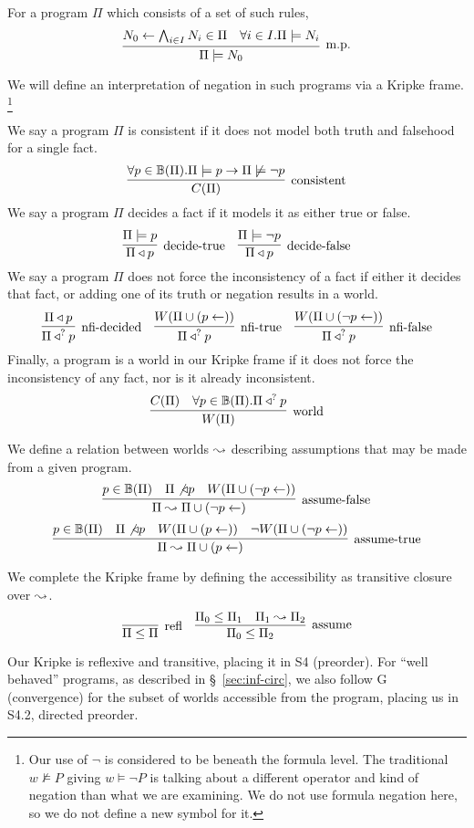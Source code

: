 For a program $\Pi$ which consists of a set of such rules,
\[
	\infer[\textrm{m.p.}]{\Pi \models N_0}{N_0 \leftarrow \bigwedge_{i \in I} N_i \in \Pi & \forall i \in I. \Pi \models N_i}
\]

We will define an interpretation of negation in such programs via a Kripke frame.
\footnote{Our use of $\neg$ is considered to be beneath the formula level.
The traditional $w \not \models P$ giving $w \models \neg P$ is talking about a different operator and kind of negation than what we are examining.
We do not use formula negation here, so we do not define a new symbol for it.}

We say a program $\Pi$ is consistent if it does not model both truth and falsehood for a single fact.
\[
	\infer[\textrm{consistent}]{\cons{\Pi}}{\forall p \in \hb(\Pi). \Pi \models p \imp \Pi \not \models \neg p}
\]
We say a program $\Pi$ decides a fact if it models it as either true or false.
\[
	\infer[\textrm{decide-true}]{\Pi \decides p}{\Pi \models p}
	\quad
	\infer[\textrm{decide-false}]{\Pi \decides p}{\Pi \models \neg p}
\]
We say a program $\Pi$ does not force the inconsistency of a fact if either it decides that fact, or adding one of its truth or negation results in a world.
\[
	\infer[\textrm{nfi-decided}]{\nfi{\Pi}{p}}{\Pi \decides p}
	\quad
	\infer[\textrm{nfi-true}]{\nfi{\Pi}{p}}{\world{\Pi \cup (p \leftarrow)}}
	\quad
	\infer[\textrm{nfi-false}]{\nfi{\Pi}{p}}{\world{\Pi \cup (\neg p \leftarrow)}}
\]
Finally, a program is a world in our Kripke frame if it does not force the inconsistency of any fact, nor is it already inconsistent.
\[
	\infer[\textrm{world}]{\world{\Pi}}{\cons{\Pi} & \forall p \in \hb(\Pi). \nfi{\Pi}{p}}
\]

We define a relation between worlds $\leadsto$ describing assumptions that may be made from a given program.
\[
	\infer[\textrm{assume-false}]{\Pi \stepass \Pi \cup (\neg p \leftarrow)}{p \in \hb(\Pi) & \Pi \not \decides p & \world{\Pi \cup (\neg p \leftarrow)}}
\]
\[
	\infer[\textrm{assume-true}]{\Pi \stepass \Pi \cup (p \leftarrow)}{p \in \hb(\Pi) & \Pi \not \decides p & \world{\Pi \cup (p \leftarrow)} & \neg \world{\Pi \cup (\neg p \leftarrow)}}
\]

We complete the Kripke frame by defining the accessibility as transitive closure over $\leadsto$.
\[
	\infer[\textrm{refl}]{\Pi \leq \Pi}{}
	\quad
	\infer[\textrm{assume}]{\Pi_0 \leq \Pi_2}{\Pi_0 \leq \Pi_1 & \Pi_1 \stepass \Pi_2}
\]

Our Kripke is reflexive and transitive, placing it in S4 (preorder).
For ``well behaved'' programs, as described in \S~\ref{sec:inf-circ}, we also follow G (convergence) for the subset of worlds accessible from the program, placing us in S4.2, directed preorder.

